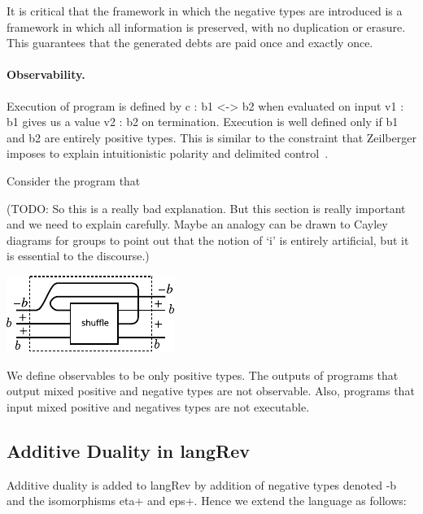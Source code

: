 \documentclass[preprint]{sigplanconf}
\begin{document}
It is critical that the framework in which the negative types are introduced
is a framework in which all information is preserved, with no duplication or
erasure. This guarantees that the generated debts are paid once and exactly
once.

\paragraph*{Observability.} 
Execution of program is defined by {{c : b1 <-> b2}} when evaluated on input
{{v1 : b1}} gives us a value {{v2 : b2}} on termination. Execution is well
defined only if {{b1}} and {{b2}} are entirely positive types. This is
similar to the constraint that Zeilberger imposes to explain intuitionistic
polarity and delimited control~\cite{10.1109/LICS.2010.23}.

Consider the program that

(TODO: So this is a really bad explanation. But this section is really
important and we need to explain carefully. Maybe an analogy can be
drawn to Cayley diagrams for groups to point out that the notion of
`i' is entirely artificial, but it is essential to the discourse.)

\begin{center}
  \includegraphics{diagrams/shuffle.pdf}
\end{center}

We define observables to be only positive types. The outputs of
programs that output mixed positive and negative types are not
observable.  Also, programs that input mixed positive and negatives
types are not executable.

\subsection{Additive Duality in {{langRev}} }

Additive duality is added to {{langRev}} by addition of negative types
denoted {{-b}} and the isomorphisms {{eta+}} and {{eps+}}. Hence we
extend the language as follows:

%
\end{document}
